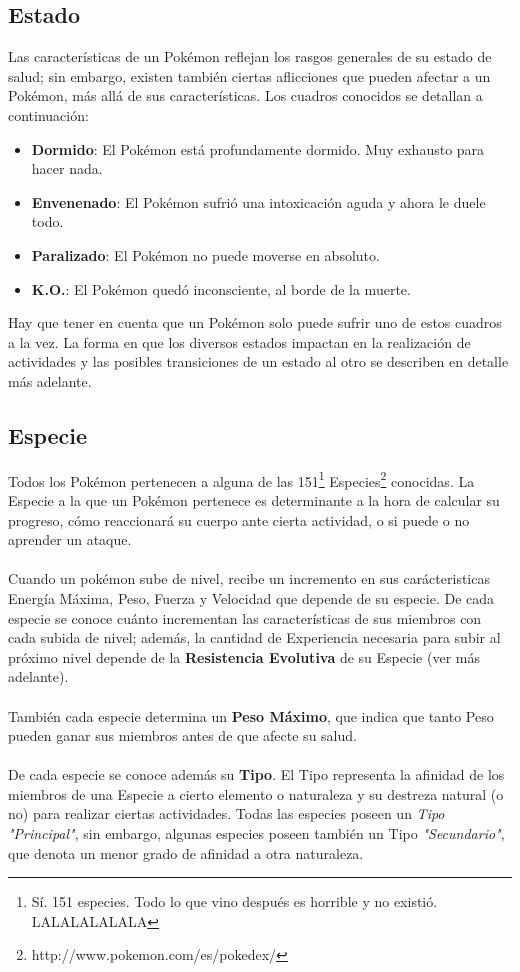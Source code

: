 \documentclass[spanish,a4paper]{article}
\begin{document}
\subsection{Estado}

Las características de un Pokémon reflejan los rasgos generales de su estado de salud; sin embargo, existen también ciertas aflicciones que pueden afectar a un Pokémon, más allá de sus características. Los cuadros conocidos se detallan a continuación:

\begin{itemize}
\item \textbf{Dormido}: El Pokémon está profundamente dormido. Muy exhausto para hacer nada.
\item \textbf{Envenenado}: El Pokémon sufrió una intoxicación aguda y ahora le duele todo.
\item \textbf{Paralizado}: El Pokémon no puede moverse en absoluto.
\item \textbf{K.O.}: El Pokémon quedó inconsciente, al borde de la muerte.
\end{itemize}

Hay que tener en cuenta que un Pokémon solo puede sufrir uno de estos cuadros a la vez. 
La forma en que los diversos estados impactan en la realización de actividades y las posibles transiciones de un estado al otro se describen en detalle más adelante.

\subsection{Especie}

Todos los Pokémon pertenecen a alguna de las 151\footnote{Sí. 151 especies. Todo lo que vino después es horrible y no existió. LALALALALALA} Especies\footnote{http://www.pokemon.com/es/pokedex/} conocidas. 
La Especie a la que un Pokémon pertenece es determinante a la hora de calcular su progreso, cómo reaccionará su cuerpo ante cierta actividad, o si puede o no aprender un ataque.
\\\\
Cuando un pokémon sube de nivel, recibe un incremento en sus carácteristicas Energía Máxima, Peso, Fuerza y Velocidad que depende de su especie. 
De cada especie se conoce cuánto incrementan las características de sus miembros con cada subida de nivel; además, la cantidad de Experiencia necesaria para subir al próximo nivel depende de la \textbf{ Resistencia Evolutiva } de su Especie (ver más adelante).
\\\\
También cada especie determina un \textbf{Peso Máximo}, que indica que tanto Peso pueden ganar sus miembros antes de que afecte su salud.
\\\\
De cada especie se conoce además su \textbf{Tipo}. 
El Tipo representa la afinidad de los miembros de una Especie a cierto elemento o naturaleza y su destreza natural (o no) para realizar ciertas actividades. 
Todas las especies poseen un \textit{ Tipo } \textit{"Principal"}, sin embargo, algunas especies poseen también un Tipo \textit{"Secundario"}, que denota un menor grado de afinidad a otra naturaleza.
\end{document}
